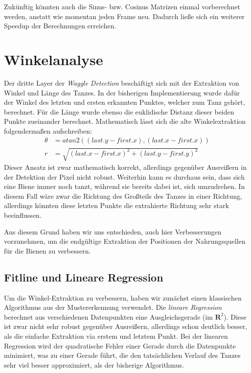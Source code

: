 \documentclass[11pt,a4paper]{article}
\begin{document}
Zukünftig könnten auch die Sinus- bzw. Cosinus Matrizen einmal vorberechnet werden, anstatt wie momentan jeden Frame neu. Dadurch ließe sich ein weiterer Speedup der Berechnungen erreichen.

\section{Winkelanalyse}%

Der dritte Layer der \textit{Waggle Detection} beschäftigt sich mit der Extraktion von Winkel und Länge des Tanzes.
In der bisherigen Implementierung wurde dafür der Winkel des letzten und ersten erkannten Punktes, welcher zum Tanz gehört, berechnet. Für die Länge wurde ebenso die euklidische Distanz dieser beiden Punkte zueinander berechnet.
Mathematisch lässt sich die alte Winkelextraktion folgendermaßen aufschreiben:
\begin{align}
\theta &= atan2((last.y-first.x), (last.x-first.x)) \\
r &= \sqrt{(last.x-first.x)^2 + (last.y-first.y)^2}
\end{align}
Dieser Ansatz ist zwar mathematisch korrekt, allerdings gegenüber Ausreißern in der Detektion der Pixel nicht robust.
Weiterhin kann es durchaus sein, dass sich eine Biene immer noch tanzt, während sie bereits dabei ist, sich umzudrehen. In diesem Fall wäre zwar die Richtung des Großteils des Tanzes in einer Richtung, allerdings könnten diese letzten Punkte die extrahierte Richtung sehr stark beeinflussen.

Aus diesem Grund haben wir uns entschieden, auch hier Verbesserungen vorzunehmen, um die endgültige Extraktion der Positionen der Nahrungsquellen für die Bienen zu verbessern.

\subsection{Fitline und Lineare Regression}%
Um die Winkel-Extraktion zu verbessern, haben wir zunächst einen klassischen Algorithmus aus der Mustererkennung verwendet. Die \textit{lineare Regression} berechnet aus verschiedenen Datenpunkten eine Ausgleichsgerade (im $\mathbf{R}^2$). Diese ist zwar nicht sehr robust gegenüber Ausreißern, allerdings schon deutlich besser, als die einfache Extraktion via erstem und letztem Punkt.
Bei der linearen Regression wird der quadratische Fehler einer Gerade durch die Datenpunkte minimiert, was zu einer Gerade führt, die den tatsächlichen Verlauf des Tanzes sehr viel besser approximiert, als der bisherige Algorithmus.
\end{document}
